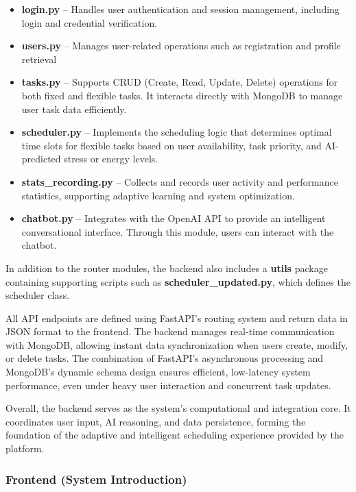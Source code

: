 \documentclass[12pt, a4paper]{article}
\begin{document}
            \begin{itemize}
                \item \textbf{login.py} – Handles user authentication and session management, including login and credential verification.
                \item \textbf{users.py} – Manages user-related operations such as registration and profile retrieval
                \item \textbf{tasks.py} – Supports CRUD (Create, Read, Update, Delete) operations for both fixed and flexible tasks. It interacts directly with MongoDB to manage user task data efficiently.
                \item \textbf{scheduler.py} – Implements the scheduling logic that determines optimal time slots for flexible tasks based on user availability, task priority, and AI-predicted stress or energy levels.
                \item \textbf{stats\_recording.py} – Collects and records user activity and performance statistics, supporting adaptive learning and system optimization.
                \item \textbf{chatbot.py} – Integrates with the OpenAI API to provide an intelligent conversational interface. Through this module, users can interact with the chatbot.
            \end{itemize}
            
            In addition to the router modules, the backend also includes a \textbf{utils} package containing supporting scripts such as \textbf{scheduler\_updated.py}, which defines the scheduler class.
            
            All API endpoints are defined using FastAPI’s routing system and return data in JSON format to the frontend. The backend manages real-time communication with MongoDB, allowing instant data synchronization when users create, modify, or delete tasks. The combination of FastAPI’s asynchronous processing and MongoDB’s dynamic schema design ensures efficient, low-latency system performance, even under heavy user interaction and concurrent task updates.
            
            Overall, the backend serves as the system’s computational and integration core. It coordinates user input, AI reasoning, and data persistence, forming the foundation of the adaptive and intelligent scheduling experience provided by the platform.
        
        \subsubsection{Frontend (System Introduction)}
        
\end{document}
